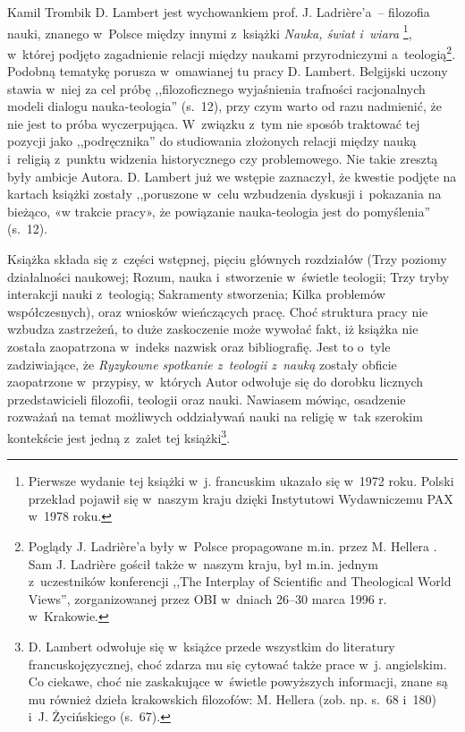 \begin{recplenv}{Kamil Trombik}
D. Lambert jest wychowankiem prof. J. Ladrière’a~-- filozofia nauki, znanego w~Polsce między innymi z~książki
\textit{Nauka, świat i~wiara}
\parencite{ladriere_nauka_1978}\footnote{Pierwsze wydanie tej książki w~j.
francuskim ukazało się w~1972 roku. Polski przekład pojawił się w~naszym kraju dzięki Instytutowi
Wydawniczemu PAX w~1978 roku. }, w~której podjęto zagadnienie relacji między naukami przyrodniczymi a~teologią\footnote{Poglądy J.
Ladrière’a były w~Polsce propagowane m.in. przez M. Hellera
\parencite*{heller_wyzwanie_1978}.
Sam J. Ladrière gościł
także w~naszym kraju, był m.in. jednym z~uczestników konferencji ,,The Interplay of Scientific and Theological World
Views'', zorganizowanej przez OBI w~dniach 26–30 marca 1996 r. w~Krakowie.}. Podobną tematykę porusza w~omawianej tu
pracy D. Lambert. Belgijski uczony stawia w~niej za cel próbę ,,filozoficznego wyjaśnienia trafności racjonalnych modeli
dialogu nauka-teologia'' (s.~12), przy czym warto od razu nadmienić, że nie jest to próba wyczerpująca. W~związku z~tym
nie sposób traktować tej pozycji jako ,,podręcznika'' do studiowania złożonych relacji między nauką i~religią z~punktu
widzenia historycznego czy problemowego. Nie takie zresztą były ambicje Autora. D. Lambert już we wstępie zaznaczył, że
kwestie podjęte na kartach książki zostały ,,poruszone w~celu wzbudzenia dyskusji i~pokazania na bieżąco, «w trakcie
pracy», że powiązanie nauka-teologia jest do pomyślenia'' (s.~12).

Książka składa się z~części wstępnej, pięciu głównych rozdziałów (Trzy poziomy działalności naukowej; Rozum,
nauka i~stworzenie w~świetle teologii; Trzy tryby interakcji nauki z~teologią; Sakramenty stworzenia; Kilka problemów
współczesnych), oraz wniosków wieńczących pracę. Choć struktura pracy nie wzbudza zastrzeżeń, to duże zaskoczenie może
wywołać fakt, iż książka nie została zaopatrzona w~indeks nazwisk oraz bibliografię. Jest to o~tyle zadziwiające, że
\textit{Ryzykowne spotkanie z~teologii z~nauką} zostały obficie zaopatrzone w~przypisy, w~których Autor odwołuje się do
dorobku licznych przedstawicieli filozofii, teologii oraz nauki. Nawiasem mówiąc, osadzenie rozważań na temat możliwych
oddziaływań nauki na religię w~tak szerokim kontekście jest jedną z~zalet tej książki\footnote{D. Lambert odwołuje
się w~książce przede wszystkim do literatury francuskojęzycznej, choć zdarza mu się cytować także prace w~j. angielskim. Co
ciekawe, choć nie zaskakujące w~świetle powyższych informacji, znane są mu również dzieła krakowskich
filozofów: M. Hellera (zob. np. s.~68 i~180) i~J. Życińskiego (s.~67).}. 


\end{recplenv}
